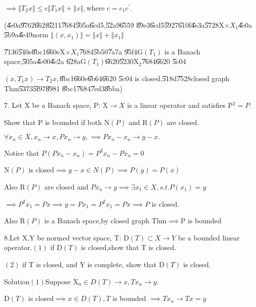 \documentclass{article}
\begin{document}
\begin{CJK}{GBK}{song}
$\implies \left\Vert T_{2}x\right\Vert \leq c\left\Vert T_{1}x\right\Vert
+\left\Vert x\right\Vert ,$where $c=c_{1}c^{\prime }.$

(\U{4e0a}\U{9762}\U{662f}\U{6211}\U{7684}\U{505a}\U{6cd5},\U{52a9}\U{6559}%
\U{89e3}\U{6cd5}\U{5927}\U{610f}\U{4e3a}\U{5728}X$\times X_{1}$\U{4e0a}%
\U{5b9a}\U{4e49}norm $\left\Vert \left( x,x_{1}\right) \right\Vert
=\left\Vert x\right\Vert +\left\Vert x_{1}\right\Vert $

\U{7136}\U{540e}\U{8bc1}\U{660e}X$\times X_{1}$\U{7684}\U{5b50}\U{7a7a}%
\U{95f4}G$\left( T_{1}\right) $ is a Banach space,\U{505a}\U{4e00}\U{4e2a}%
\U{628a}G$\left( T_{1}\right) $\U{6620}\U{5230}X$_{2}$\U{7684}\U{6620}%
\U{5c04}

$\left( x,T_{1}x\right) \rightarrow T_{2}x,$\U{8bc1}\U{660e}\U{6b64}\U{6620}%
\U{5c04} is closed,\U{518d}\U{7528}closed graph Thm\U{5373}\U{5f97}\U{8981}%
\U{8bc1}\U{7684}\U{7ed3}\U{8bba})

7. Let X be a Banach space, P: X$\rightarrow X$ is a linear operator and
satisfies P$^{2}=P.$

Show that P is bounded if both N$\left( P\right) $ and R$\left( P\right) $
are closed.

$\forall x_{n}\in X,x_{n}\rightarrow x,Px_{n}\rightarrow y,\implies
Px_{n}-x_{n}\rightarrow y-x.$

Notice that $P\left( Px_{n}-x_{n}\right) =P^{2}x_{n}-Px_{n}=0$

N$\left( P\right) $ is closed$\implies y-x\in N\left( P\right) \implies
P\left( y\right) =P\left( x\right) $

Also R$\left( P\right) $ are closed and $Px_{n}\rightarrow y\implies \exists
x_{1}\in X,s.t.P\left( x_{1}\right) =y$

$\implies P^{2}x_{1}=Px\implies y=Px_{1}=P^{2}x_{1}=Px\implies P$ is closed.

Also R$\left( P\right) $ is a Banach space,by closed graph Thm$\implies $P
is bounded

8.Let X,Y be normed vector space, T: D$\left( T\right) \subset X\rightarrow
Y $ be a bounded linear operator.$\left( 1\right) $ if D$\left( T\right) $
is closed,show that T is closed.

$\left( 2\right) $ if T is closed, and Y is complete, show that D$\left(
T\right) $ is closed.

Solution$\left( 1\right) $Suppose X$_{n}\in D\left( T\right) \rightarrow
x,Tx_{n}\rightarrow y.$

D$\left( T\right) $ is closed$\implies x\in D\left( T\right) ,T$ is bounded $%
\implies Tx_{n}\rightarrow Tx=y$


\end{CJK}
\end{document}
